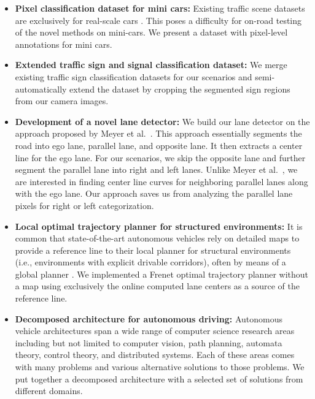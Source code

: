 \begin{itemize}
  \item \textbf{Pixel classification dataset for mini cars:} Existing traffic
    scene datasets are exclusively for real-scale cars \cite{Huang2018TheAD,
    Cordts2016TheCD, Geiger2012AreWR, Neuhold2017TheMV}. This poses a
    difficulty for on-road testing of the novel methods on mini-cars. We
    present a dataset with pixel-level annotations for mini cars.
  \item \textbf{Extended traffic sign and signal classification dataset:} We
    merge existing traffic sign classification datasets
    \cite{Timofte2009MultiviewTS, Stallkamp2012ManVC, Shakhuro2016RussianTS,
    Serna2018ClassificationOT, MaldonadoBascn2007RoadSignDA} for our scenarios
    and semi-automatically extend the dataset by cropping the segmented sign
    regions from our camera images.
  \item \textbf{Development of a novel lane detector:} We build our lane
    detector on the approach proposed by Meyer et al.\ \cite{Meyer2018DeepSL}.
    This approach essentially segments the road into ego lane, parallel lane,
    and opposite lane. It then extracts a center line for the ego lane. For our
    scenarios, we skip the opposite lane and further segment the parallel lane
    into right and left lanes. Unlike Meyer et al.\ \cite{Meyer2018DeepSL}, we
    are interested in finding center line curves for neighboring parallel lanes
    along with the ego lane. Our approach saves us from analyzing the parallel
    lane pixels for right or left categorization.
  \item \textbf{Local optimal trajectory planner for structured environments:}
    It is common that state-of-the-art autonomous vehicles rely on detailed
    maps to provide a reference line to their local planner for structural
    environments (i.e., environments with explicit drivable corridors), often
    by means of a global planner \cite{Thrun2006StanleyTR,
    Montemerlo2009JuniorTS, Kato2018AutowareOB}. We implemented a Frenet
    optimal trajectory planner \cite{Werling2010OptimalTG} without a map using
    exclusively the online computed lane centers as a source of the reference
    line.
  \item \textbf{Decomposed architecture for autonomous driving:} Autonomous
    vehicle architectures span a wide range of computer science research areas
    including but not limited to computer vision, path planning, automata
    theory, control theory, and distributed systems. Each of these areas comes
    with many problems and various alternative solutions to those problems. We
    put together a decomposed architecture with a selected set of solutions
    from different domains.
\end{itemize}

